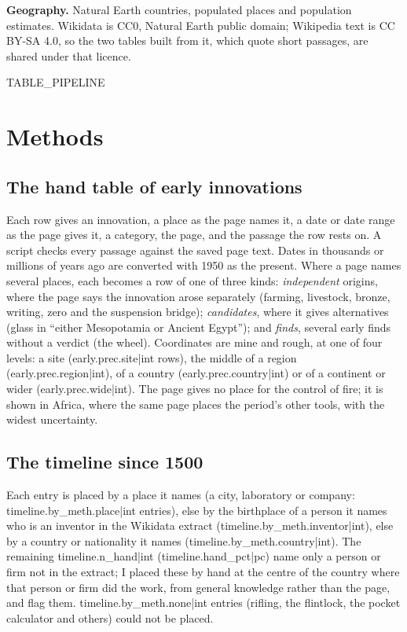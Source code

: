 \documentclass[11pt,a4paper]{article}
\begin{document}
\textbf{Geography.} Natural Earth \citep{naturalearth} countries, populated places and population estimates. Wikidata is CC0, Natural Earth public domain; Wikipedia text is CC BY-SA 4.0, so the two tables built from it, which quote short passages, are shared under that licence.

{{TABLE_PIPELINE}}

\section{Methods}
\subsection{The hand table of early innovations}
Each row gives an innovation, a place as the page names it, a date or date range as the page gives it, a category, the page, and the passage the row rests on. A script checks every passage against the saved page text. Dates in thousands or millions of years ago are converted with 1950 as the present. Where a page names several places, each becomes a row of one of three kinds: \emph{independent} origins, where the page says the innovation arose separately (farming, livestock, bronze, writing, zero and the suspension bridge); \emph{candidates}, where it gives alternatives (glass in ``either Mesopotamia or Ancient Egypt''); and \emph{finds}, several early finds without a verdict (the wheel). Coordinates are mine and rough, at one of four levels: a site ({{early.prec.site|int}} rows), the middle of a region ({{early.prec.region|int}}), of a country ({{early.prec.country|int}}) or of a continent or wider ({{early.prec.wide|int}}). The page gives no place for the control of fire; it is shown in Africa, where the same page places the period's other tools, with the widest uncertainty.

\subsection{The timeline since 1500}
Each entry is placed by a place it names (a city, laboratory or company: {{timeline.by_meth.place|int}} entries), else by the birthplace of a person it names who is an inventor in the Wikidata extract ({{timeline.by_meth.inventor|int}}), else by a country or nationality it names ({{timeline.by_meth.country|int}}). The remaining {{timeline.n_hand|int}} ({{timeline.hand_pct|pc}}) name only a person or firm not in the extract; I placed these by hand at the centre of the country where that person or firm did the work, from general knowledge rather than the page, and flag them. {{timeline.by_meth.none|int}} entries (rifling, the flintlock, the pocket calculator and others) could not be placed.
\end{document}
